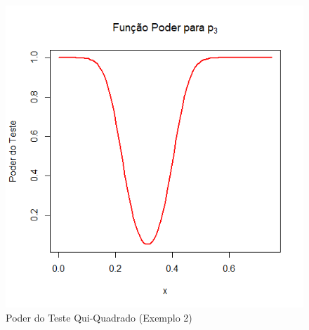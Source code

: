 \documentclass[12pt]{beamer}
\begin{document}
\begin{frame}{}
\begin{block}{}
\begin{figure}
    \centering
    \includegraphics[scale=0.5]{figs/Ex2p3.png}
    \caption{Poder do Teste Qui-Quadrado (Exemplo 2)}
    \label{fig:enter-label}
\end{figure}
\end{block}
\end{frame}
\end{document}
